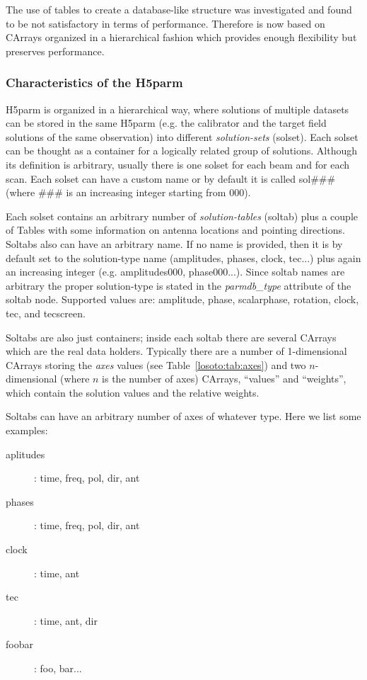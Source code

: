 \documentclass[structabstract]{article}
\begin{document}
The use of tables to create a database-like structure was investigated and found to be not satisfactory in terms of performance. Therefore \losoto{} is now based on CArrays organized in a hierarchical fashion which provides enough flexibility but preserves performance.

\subsubsection{Characteristics of the H5parm}
\label{losoto:characteristics_h5parm}

H5parm is organized in a hierarchical way, where solutions of multiple datasets can be stored in the same H5parm (e.g. the calibrator and the target field solutions of the same observation) into different \textit{solution-sets} (solset). Each solset can be thought as a container for a logically related group of solutions. Although its definition is arbitrary, usually there is one solset for each beam and for each scan. Each solset can have a custom name or by default it is called sol\#\#\# (where \#\#\# is an increasing integer starting from 000).

Each solset contains an arbitrary number of \textit{solution-tables} (soltab) plus a couple of Tables with some information on antenna locations and pointing directions. Soltabs also can have an arbitrary name. If no name is provided, then it is by default set to the solution-type name (amplitudes, phases, clock, tec...) plus again an increasing integer (e.g. amplitudes000, phase000...). Since soltab names are arbitrary the proper solution-type is stated in the \textit{parmdb\_type} attribute of the soltab node. Supported values are: amplitude, phase, scalarphase, rotation, clock, tec, and tecscreen.

Soltabs are also just containers; inside each soltab there are several CArrays which are the real data holders. Typically there are a number of 1-dimensional CArrays storing the \textit{axes} values (see Table~\ref{losoto:tab:axes}) and two $n$-dimensional (where $n$ is the number of axes) CArrays, ``values'' and ``weights'', which contain the solution values and the relative weights.

Soltabs can have an arbitrary number of axes of whatever type. Here we list some examples:
\begin{description}
 \item[aplitudes]: time, freq, pol, dir, ant
 \item[phases]: time, freq, pol, dir, ant
 \item[clock]: time, ant
 \item[tec]: time, ant, dir
 \item[foobar]: foo, bar...
\end{description}
\end{document}
